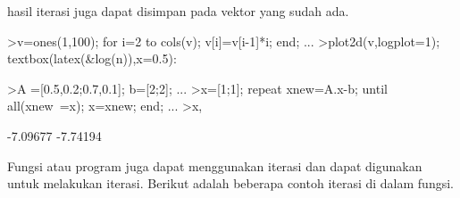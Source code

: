 \documentclass[12pt,arial,letterpaper]{book}
\begin{document}
\begin{eulercomment}
\begin{eulercomment}
\begin{eulercomment}
\begin{eulercomment}
\begin{eulercomment}
\begin{eulercomment}
\begin{eulercomment}
\begin{eulercomment}
\begin{eulercomment}
\begin{eulercomment}
\begin{eulercomment}
\begin{eulercomment}
\begin{eulercomment}
\begin{eulercomment}
\begin{eulercomment}
\begin{eulercomment}
\begin{eulercomment}
\begin{eulercomment}
\begin{eulercomment}
\begin{eulercomment}
\begin{eulercomment}
\begin{eulercomment}
\begin{eulercomment}
\begin{eulercomment}
\begin{euleroutput}
  [1,  2,  6,  24,  120,  720,  5040,  40320]
\end{euleroutput}
\begin{eulercomment}
hasil iterasi juga dapat disimpan pada vektor yang sudah ada.
\end{eulercomment}
\begin{eulerprompt}
>v=ones(1,100); for i=2 to cols(v); v[i]=v[i-1]*i; end; ...
>plot2d(v,logplot=1); textbox(latex(&log(n)),x=0.5):
\end{eulerprompt}
\begin{eulerprompt}
>A =[0.5,0.2;0.7,0.1]; b=[2;2]; ...
>x=[1;1]; repeat xnew=A.x-b; until all(xnew~=x); x=xnew; end; ...
>x,
\end{eulerprompt}
\begin{euleroutput}
       -7.09677 
       -7.74194 
\end{euleroutput}
\begin{eulercomment}
Fungsi atau program juga dapat menggunakan iterasi dan dapat digunakan untuk melakukan iterasi. Berikut adalah beberapa contoh
iterasi di dalam fungsi.


\end{eulercomment}
\end{eulercomment}
\end{eulercomment}
\end{eulercomment}
\end{eulercomment}
\end{eulercomment}
\end{eulercomment}
\end{eulercomment}
\end{eulercomment}
\end{eulercomment}
\end{eulercomment}
\end{eulercomment}
\end{eulercomment}
\end{eulercomment}
\end{eulercomment}
\end{eulercomment}
\end{eulercomment}
\end{eulercomment}
\end{eulercomment}
\end{eulercomment}
\end{eulercomment}
\end{eulercomment}
\end{eulercomment}
\end{eulercomment}
\end{eulercomment}
\end{document}
